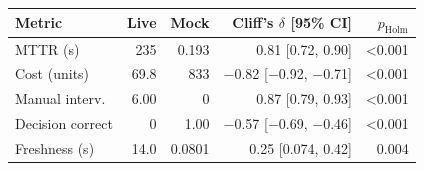 \begin{tabular}{lrrrr}
\toprule
Metric & Live & Mock & Cliff's $\delta$ [95\% CI] & $p_{\mathrm{Holm}}$ \\
\midrule
MTTR (s) & 235 & 0.193 & 0.81 [0.72, 0.90] & <0.001 \\
Cost (units) & 69.8 & 833 & \ensuremath{-}0.82 [\ensuremath{-}0.92, \ensuremath{-}0.71] & <0.001 \\
Manual interv. & 6.00 & 0 & 0.87 [0.79, 0.93] & <0.001 \\
Decision correct & 0 & 1.00 & \ensuremath{-}0.57 [\ensuremath{-}0.69, \ensuremath{-}0.46] & <0.001 \\
Freshness (s) & 14.0 & 0.0801 & 0.25 [0.074, 0.42] & 0.004 \\
\bottomrule
\end{tabular}
